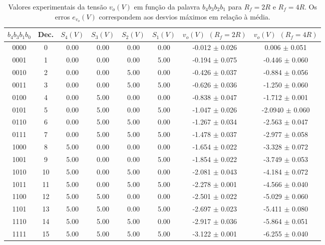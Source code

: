 \documentclass[a4paper,11pt]{report}
\begin{document}
\begin{table}[h]
\centering
\begin{tabular}{ ||c|c| c | c | c | c | c | c || }
\hline
$b_4b_3b_1b_0$& Dec. &$S_4(V)$ & $S_3(V)$ & $S_2(V)$ & $S_1(V)$ & $v_o(V)\hspace{5pt}(R_f=2R)$ & $v_o(V)\hspace{5pt}(R_f=4R)$ \\ \hline \hline
0000&0	&0.00 & 0.00 & 0.00 & 0.00 & -0.012 $\pm$ 0.026& 0.006 $\pm$ 0.051\\ \hline
0001& 1	&0.00 & 0.00 & 0.00 & 5.00 & -0.194 $\pm$ 0.075& -0.446 $\pm$ 0.060\\ \hline
0010& 2 &	0.00 & 0.00 & 5.00 & 0.00 & -0.426 $\pm$ 0.037& -0.884 $\pm$ 0.056\\ \hline
0011&3	&0.00 & 0.00 & 5.00 & 5.00 & -0.626 $\pm$ 0.036& -1.250 $\pm$ 0.060\\ \hline
0100&4	&0.00 & 5.00 & 0.00 & 0.00 & -0.838 $\pm$ 0.047& -1.712 $\pm$ 0.001\\ \hline
0101&5	&0.00 & 5.00 & 0.00 & 5.00 & -1.047 $\pm$ 0.026& -2.0940 $\pm$ 0.060 \\ \hline
0110&6	&0.00 & 5.00 & 5.00 & 0.00 & -1.267 $\pm$ 0.034& -2.563 $\pm$ 0.047\\ \hline
0111&7	&0.00 & 5.00 & 5.00 & 5.00 & -1.478 $\pm$ 0.037& -2.977 $\pm$ 0.058\\ \hline
1000&8	&5.00 & 0.00 & 0.00 & 0.00 & -1.654 $\pm$ 0.022& -3.328 $\pm$ 0.072\\ \hline
1001&9	&5.00 & 0.00 & 0.00 & 5.00 & -1.854 $\pm$ 0.022& -3.749 $\pm$ 0.053\\ \hline
1010&10	&5.00 & 0.00 & 5.00 & 0.00 & -2.081 $\pm$ 0.043& -4.184 $\pm$ 0.072\\ \hline
1011&11	&5.00 & 0.00 & 5.00 & 5.00 & -2.278 $\pm$ 0.001& -4.566 $\pm$ 0.040\\ \hline
1100&12	&5.00 & 5.00 & 0.00 & 0.00 & -2.501 $\pm$ 0.022& -5.029 $\pm$ 0.060\\ \hline
1101&13	&5.00 & 5.00 & 0.00 & 5.00 & -2.697 $\pm$ 0.023& -5.411 $\pm$ 0.080 \\ \hline
1110&14	&5.00 & 5.00 & 5.00 & 0.00 & -2.917 $\pm$ 0.036& -5.864 $\pm$ 0.051\\ \hline
1111&15	&5.00 & 5.00 & 5.00 & 5.00 & -3.122 $\pm$ 0.001& -6.255 $\pm$ 0.040 \\ \hline
\end{tabular}


\caption{Valores experimentais da tensão $v_o(V)$ em função da palavra $b_4b_3b_2b_1$ para $R_f=2R$ e $R_f=4R$. Os erros $e_{v_o}(V)$ correspondem aos desvios máximos em relação à média.\label{tab:4}}

\end{table}
\end{document}
